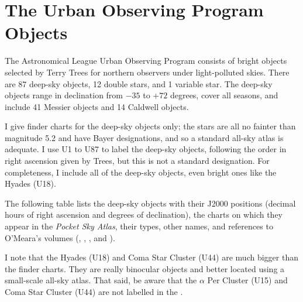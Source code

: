 
\chapter*{The Urban Observing Program Objects}

The Astronomical League Urban Observing Program consists of bright objects selected by Terry Trees for northern observers under light-polluted skies. There are 87 deep-sky objects, 12 double stars, and 1 variable star. The deep-sky objects range in declination from $-35$ to $+72$ degrees, cover all seasons, and include 41 Messier objects and 14 Caldwell objects.  

I give finder charts for the deep-sky objects only; the stars are all no fainter than magnitude 5.2 and have Bayer designations, and so a standard all-sky atlas is adequate. I use U1 to U87 to label the deep-sky objects, following the order in right ascension given by Trees, but this is not a standard designation.  For completeness, I include all of the deep-sky objects, even bright ones like the Hyades (U18).

The following table lists the deep-sky objects with their J2000 positions (decimal hours of right ascension and degrees of declination), the charts on which they appear in the \emph{Pocket Sky Atlas}, their types, other names, and references to O’Meara’s  volumes (, , , and ).

I note that the Hyades (U18) and Coma Star Cluster (U44) are much bigger than the finder charts. They are really binocular objects and better located using a small-scale all-sky atlas. That said, be aware that the $\alpha$ Per Cluster (U15) and Coma Star Cluster (U44) are not labelled in the {\PSA}. 

\clearpage

